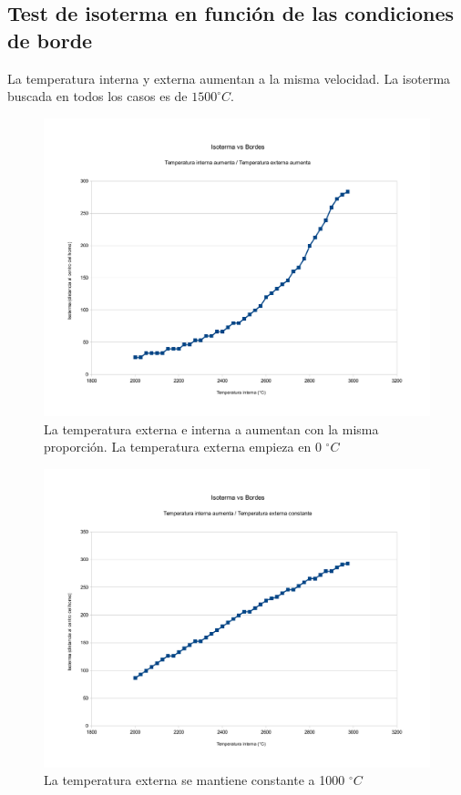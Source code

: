 \subsection{Test de isoterma en función de las condiciones de borde}

La temperatura interna y externa aumentan a la misma velocidad. La isoterma buscada en todos los
casos es de $1500 ^{\circ}C$.

\begin{figure}[H]{}
\centering
\includegraphics[scale=0.5]{graphs/isotermaVsBordesExternaAumenta.pdf}
\caption{La temperatura externa e interna a aumentan con la misma proporción. La temperatura externa empieza en 0 $^{\circ}C$}
\label{isotermaVsBordesExternaAumenta}
\end{figure}

\begin{figure}[H]{}
\centering
\includegraphics[scale=0.5]{graphs/isotermaVsBordesExternaConstante.pdf}
\caption{La temperatura externa se mantiene constante a 1000 $^{\circ} C$}
\label{isotermaVsBordesExternaConstante}
\end{figure}

